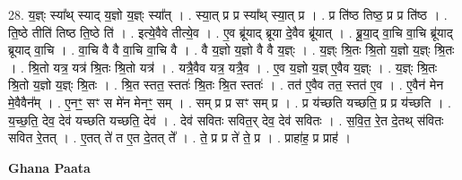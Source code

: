 \documentclass[17pt]{extarticle}
\begin{document}
28. य॒ज्ञ्ः स्या᳚थ् स्याद् य॒ज्ञो य॒ज्ञ्ः स्या᳚त् । . स्या॒त् प्र प्र स्या᳚थ् स्या॒त् प्र । . प्र ति॑ष्ठ तिष्ठ॒ प्र प्र ति॑ष्ठ । . ति॒ष्ठे तीति॑ तिष्ठ ति॒ष्ठे ति॑ । . इत्ये॒वैवे तीत्ये॒व । . ए॒व ब्रू॑याद् ब्रूया दे॒वैव ब्रू॑यात् । . ब्रू॒या॒द् वा॒चि वा॒चि ब्रू॑याद् ब्रूयाद् वा॒चि । . वा॒चि वै वै वा॒चि वा॒चि वै । . वै य॒ज्ञो य॒ज्ञो वै वै य॒ज्ञ्ः । . य॒ज्ञ्ः श्रि॒तः श्रि॒तो य॒ज्ञो य॒ज्ञ्ः श्रि॒तः । . श्रि॒तो यत्र॒ यत्र॑ श्रि॒तः श्रि॒तो यत्र॑ । . यत्रै॒वैव यत्र॒ यत्रै॒व । . ए॒व य॒ज्ञो य॒ज्ञ् ए॒वैव य॒ज्ञ्ः । . य॒ज्ञ्ः श्रि॒तः श्रि॒तो य॒ज्ञो य॒ज्ञ्ः श्रि॒तः । . श्रि॒त स्तत॒ स्ततः॑ श्रि॒तः श्रि॒त स्ततः॑ । . तत॑ ए॒वैव तत॒ स्तत॑ ए॒व । . ए॒वैन॑ मेन मे॒वैवैन᳚म् । . ए॒नꣳ॒॒ सꣳ स मे॑न मेनꣳ॒॒ सम् । . सम् प्र प्र सꣳ सम् प्र । . प्र य॑च्छति यच्छति॒ प्र प्र य॑च्छति । . य॒च्छ॒ति॒ देव॒ देव॑ यच्छति यच्छति॒ देव॑ । . देव॑ सवितः सवित॒र् देव॒ देव॑ सवितः । . स॒वि॒त॒ रे॒त दे॒तथ् स॑वितः सवित रे॒तत् । . ए॒तत् ते॑ त ए॒त दे॒तत् ते᳚ । . ते॒ प्र प्र ते॑ ते॒ प्र । . प्राहा॑ह॒ प्र प्राह॑ । \newline

\textbf{Ghana Paata } \newline
\end{document}

